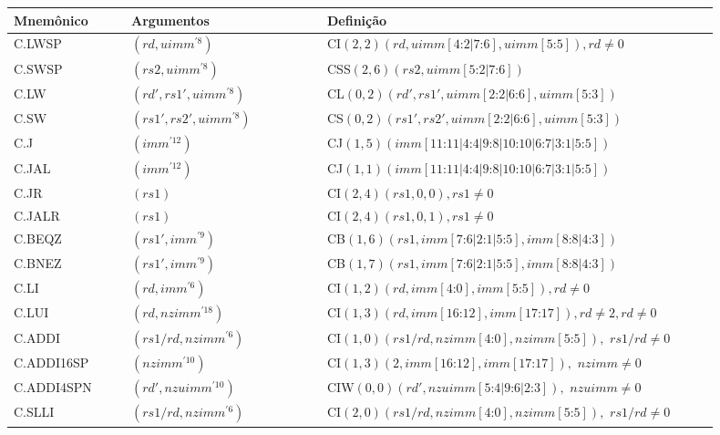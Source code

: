   \begin{table}
    \begin{tabular}{ |p{0.15\linewidth}||p{0.25\linewidth}|p{0.5\linewidth}| } 
      \hline
      Mnemônico & Argumentos & Definição \\ \hline \hline
C.LWSP & $(rd, uimm^{'8})$ & CI$(2, 2)(rd, uimm[4\text{:}2|7\text{:}6], uimm[5\text{:}5]), rd \neq 0$ \\ \hline
C.SWSP & $(rs2, uimm^{'8})$ & CSS$(2, 6)(rs2, uimm[5\text{:}2|7\text{:}6])$ \\ \hline
C.LW & $(rd', rs1', uimm^{'8})$ & CL$(0, 2)(rd', rs1', uimm[2\text{:}2|6\text{:}6], uimm[5\text{:}3])$ \\ \hline
C.SW & $(rs1', rs2', uimm^{'8})$ & CS$(0, 2)(rs1', rs2', uimm[2\text{:}2|6\text{:}6], uimm[5\text{:}3])$ \\ \hline
C.J & $(imm^{'12})$ & CJ$(1, 5)(imm[11\text{:}11|4\text{:}4|9\text{:}8|10\text{:}10|6\text{:}7|3\text{:}1|5\text{:}5])$ \\ \hline
C.JAL & $(imm^{'12})$ & CJ$(1, 1)(imm[11\text{:}11|4\text{:}4|9\text{:}8|10\text{:}10|6\text{:}7|3\text{:}1|5\text{:}5])$ \\ \hline
C.JR & $(rs1)$ & CI$(2, 4)(rs1, 0, 0), rs1 \neq 0$ \\ \hline
C.JALR & $(rs1)$ & CI$(2, 4)(rs1, 0, 1), rs1 \neq 0$ \\ \hline
C.BEQZ & $(rs1', imm^{'9})$ & CB$(1, 6)(rs1, imm[7\text{:}6|2\text{:}1|5\text{:}5], imm[8\text{:}8|4\text{:}3])$ \\ \hline
C.BNEZ & $(rs1', imm^{'9})$ & CB$(1, 7)(rs1, imm[7\text{:}6|2\text{:}1|5\text{:}5], imm[8\text{:}8|4\text{:}3])$ \\ \hline
C.LI & $(rd, imm^{'6})$ & CI$(1, 2)(rd, imm[4\text{:}0], imm[5\text{:}5]), rd \neq 0$ \\ \hline
C.LUI & $(rd, nzimm^{'18})$ & CI$(1, 3)(rd, imm[16\text{:}12], imm[17\text{:}17]), rd \neq 2, rd \neq 0$ \\ \hline
C.ADDI & $(rs1/rd, nzimm^{'6})$ & CI$(1, 0)(rs1/rd, nzimm[4\text{:}0], nzimm[5\text{:}5]),$ $rs1/rd \neq 0$ \\ \hline
C.ADDI16SP & $(nzimm^{'10})$ & CI$(1, 3)(2, imm[16\text{:}12], imm[17\text{:}17]),$ $nzimm \neq 0$ \\ \hline
C.ADDI4SPN & $(rd', nzuimm^{'10})$ & CIW$(0, 0)(rd', nzuimm[5\text{:}4|9\text{:}6|2\text{:}3]),$ $nzuimm \neq 0$ \\ \hline
C.SLLI & $(rs1/rd, nzimm^{'6})$ & CI$(2, 0)(rs1/rd, nzimm[4\text{:}0], nzimm[5\text{:}5]),$ $rs1/rd \neq 0$ \\ \hline

\end{tabular}
\end{table}
